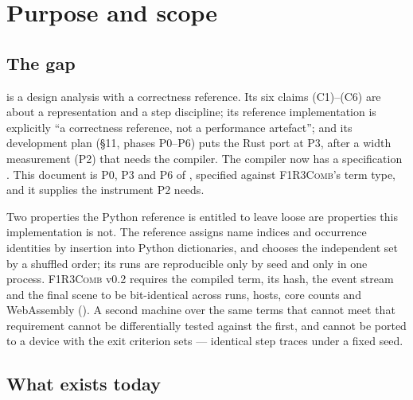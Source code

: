 \documentclass[11pt,a4paper]{article}
\newcommand{\Comb}{\textsc{F1R3Comb}}
\theoremstyle{definition}
\theoremstyle{plain}
\begin{document}
\tableofcontents

\section{Purpose and scope}\label{sec:purpose}

\subsection{The gap}

\cite{matnote} is a design analysis with a correctness reference. Its six
claims (C1)--(C6) are about a representation and a step discipline; its
reference implementation is explicitly ``a correctness reference, not a
performance artefact''; and its development plan (\S11, phases P0--P6) puts the
Rust port at P3, after a width measurement (P2) that needs the compiler. The
compiler now has a specification \cite{combspec}. This document is P0, P3 and
P6 of \cite{matnote}, specified against \Comb{}'s term type, and it supplies
the instrument P2 needs.

Two properties the Python reference is entitled to leave loose are properties
this implementation is not. The reference assigns name indices and occurrence
identities by insertion into Python dictionaries, and chooses the independent
set by a shuffled order; its runs are reproducible only by seed and only in
one process. \Comb{} v0.2 requires the compiled term, its hash, the event
stream and the final scene to be bit-identical across runs, hosts, core counts
and WebAssembly (\cite[Req.~12.4]{combspec}). A second machine over the same
terms that cannot meet that requirement cannot be differentially tested
against the first, and cannot be ported to a device with the exit criterion
\cite[P4]{matnote} sets --- identical step traces under a fixed seed.

\subsection{What exists today}
\end{document}
